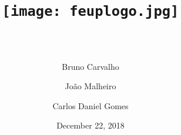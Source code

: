 \documentclass[11pt,a4paper,portrait,titlepage]{article}
\title{
	\texttt{[image: feuplogo.jpg]}\\
	{\Huge \maintitle{}}\\
	{\large \subtitle{}}
}
\date{December 22, 2018}
\author{
	Bruno Carvalho\\\text{up201606517}
	\and
	João Malheiro\\\text{up201605926}
	\and
	Carlos Daniel Gomes\\\text{up201603404}
}
\begin{document}
\begin{titlepage}
\maketitle
\tableofcontents
\thispagestyle{empty}
\end{titlepage}


\clearpage

\end{document}
